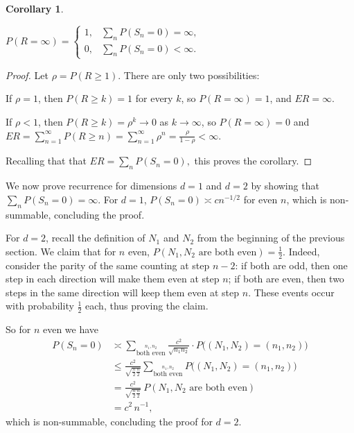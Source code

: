 \documentclass[a4paper,12pt]{article}
\newtheorem{theorem}[equation]{Theorem}
\newtheorem{corollary}[equation]{Corollary}
\theoremstyle{definition}
\newcommand{\Z}{\mathbb{Z}}
\renewcommand{\geq}{\geqslant}
\renewcommand{\le}{\leqslant}
\begin{document}
\begin{corollary}
\begin{singlespace}
\(
P(R=\infty) =
\begin{cases}
1, & \sum_n P(S_n=0) = \infty
,\\
0, & \sum_n P(S_n=0) < \infty
.
\end{cases}
\)
\end{singlespace}
\end{corollary}
\begin{proof}
Let $\rho=P(R \geq 1)$. There are only two possibilities:

If $\rho=1$, then $P(R \geq k)=1$ for every $k$, so $P(R=\infty)=1$, and $ER=\infty$.

If $\rho<1$, then $P(R \geq k) = \rho^k \to 0$ as $k\to\infty$, so $P(R=\infty)=0$ and $ER = \sum_{n=1}^\infty P(R \geq n) = \sum_{n=1}^\infty \rho^n = \frac{\rho}{1-\rho} < \infty$. 

Recalling that that
\(
ER = \sum_n P(S_n=0)
,
\)
this proves the corollary.
\end{proof}

We now prove recurrence for dimensions $d=1$ and $d=2$ by showing that $\sum_n P(S_n=0) = \infty$.
For $d=1$, $P(S_n=0) \asymp c n^{-1/2}$ for even $n$, which is non-summable, concluding the proof.


For $d=2$, recall the definition of $N_1$ and $N_2$ from the beginning of the previous section. We claim that for $n$ even, $P(N_1,N_2 \text{ are both even})=\frac{1}{2}$.
Indeed, consider the parity of the same counting at step $n-2$: if both are odd, then one step in each direction will make them even at step $n$; if both are even, then two steps in the same direction will keep them even at step $n$. These events occur with probability $\tfrac{1}{2}$ each, thus proving the claim.

So for $n$ even we have
\begin{align*}
P(S_n=0)
& \asymp
\sum_{\stackrel{n_1,n_2}{\text{both even}}}
\frac{c^2}{\sqrt{n_1 n_2}}
\cdot
P\big((N_1,N_2)=(n_1,n_2)\big)
\\
& \le
\frac{c^2}{\sqrt{\frac{n}{2}\frac{n}{2}}}
\sum_{\stackrel{n_1,n_2}{\text{both even}}}
P\big((N_1,N_2)=(n_1,n_2)\big)
\\
& =
\frac{c^2}{\sqrt{\frac{n}{2}\frac{n}{2}}}
\
P(N_1,N_2 \text{ are both even})
\\
& =
{c^2} \, n^{-1}
,
\end{align*}
which is non-summable, concluding the proof for $d=2$.

\end{document}
